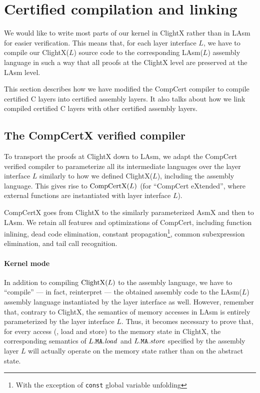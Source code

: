 \section{Certified compilation and linking}
\label{sec:seq:comp}

We would like to write most parts of our kernel in ClightX rather than
in LAsm for easier verification.  This means that, for
each layer interface $L$, we have to compile our ClightX($L$) source code to the
corresponding LAsm($L$) assembly language in such a way that all
proofs at the ClightX level are preserved at the LAsm
level.

This section describes how we have modified the CompCert compiler to
compile certified C layers into certified assembly layers. It also talks about
how we link compiled certified C layers with other certified assembly layers. 

\subsection{The CompCertX verified compiler}
\label{sec:seq:comp:concrete}
To transport the proofs at ClightX down to LAsm, we adapt the CompCert
verified compiler to parameterize all
its intermediate languages over the layer interface $L$ similarly to
how we defined ClightX($L$), including the assembly language. This gives rise to
$\textrm{CompCertX(}L\textrm{)}$ (for ``CompCert eXtended'', where external functions
are instantiated with layer interface $L$).

CompCertX goes from ClightX to the similarly parameterized AsmX and
then to LAsm. We retain all features and optimizations of CompCert,
including function inlining, dead code elimination, 
constant
propagation\footnote{With the exception of \texttt{const} global
  variable unfolding},
common subexpression elimination, and tail call
recognition.


\paragraph{Kernel mode}

In addition to compiling $\textrm{ClightX(}L\textrm{)}$ to the assembly
language,  
we have to ``compile'' --- in fact, reinterpret
--- the obtained assembly code to the LAsm($L$) assembly language
instantiated by the layer interface as well. However, remember that, contrary to
ClightX, the semantics of memory accesses in LAsm is entirely
parameterized by the layer interface $L$. Thus, it becomes necessary to prove
that, for every access (\ie, load and store)
to the memory state in ClightX, the
corresponding semantics of $L.{\texttt{MA}}.\mathit{load}$ and
$L.{\texttt{MA}}.\mathit{store}$ specified by the assembly layer  $L$
will actually operate on the memory state rather than on the abstract
state.


